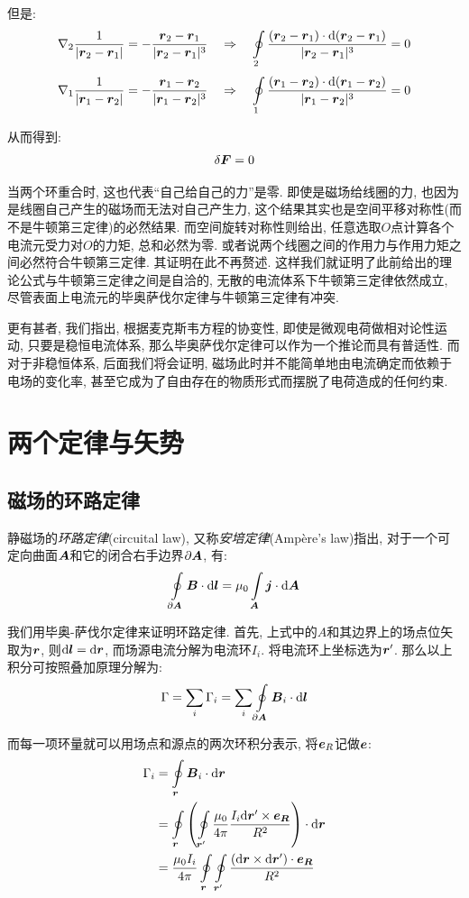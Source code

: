 但是:
\[\nabla_2 \frac{1}{|\boldsymbol{r}_2-\boldsymbol{r}_1|}=-\frac{\boldsymbol{r}_2-\boldsymbol{r}_1}{|\boldsymbol{r}_2-\boldsymbol{r}_1|^3}\quad\Rightarrow\quad \oint\limits_2\frac{(\boldsymbol{r}_2-\boldsymbol{r}_1)\cdot\textrm{d}(\boldsymbol{r}_2-\boldsymbol{r}_1)}{|\boldsymbol{r}_2-\boldsymbol{r}_1|^3}=0\]
\[\nabla_1 \frac{1}{|\boldsymbol{r}_1-\boldsymbol{r}_2|}=-\frac{\boldsymbol{r}_1-\boldsymbol{r}_2}{|\boldsymbol{r}_1-\boldsymbol{r}_2|^3}\quad\Rightarrow\quad \oint\limits_1\frac{(\boldsymbol{r}_1-\boldsymbol{r}_2)\cdot\textrm{d}(\boldsymbol{r}_1-\boldsymbol{r}_2)}{|\boldsymbol{r}_1-\boldsymbol{r}_2|^3}=0\]

从而得到:
\[\delta\boldsymbol{F}=0\]

当两个环重合时, 这也代表``自己给自己的力''是零. 即使是磁场给线圈的力, 也因为是线圈自己产生的磁场而无法对自己产生力, 这个结果其实也是空间平移对称性(而不是牛顿第三定律)的必然结果. 而空间旋转对称性则给出, 任意选取$O$点计算各个电流元受力对$O$的力矩, 总和必然为零. 或者说两个线圈之间的作用力与作用力矩之间必然符合牛顿第三定律. 其证明在此不再赘述. 这样我们就证明了此前给出的理论公式与牛顿第三定律之间是自洽的, 无散的电流体系下牛顿第三定律依然成立, 尽管表面上电流元的毕奥萨伐尔定律与牛顿第三定律有冲突.

更有甚者, 我们指出, 根据麦克斯韦方程的协变性, 即使是微观电荷做相对论性运动, 只要是稳恒电流体系, 那么毕奥萨伐尔定律可以作为一个推论而具有普适性. 而对于非稳恒体系, 后面我们将会证明, 磁场此时并不能简单地由电流确定而依赖于电场的变化率, 甚至它成为了自由存在的物质形式而摆脱了电荷造成的任何约束.

\section{两个定律与矢势}

\subsection{磁场的环路定律}

静磁场的\emph{环路定律}(circuital law), 又称\emph{安培定律}(Amp\`ere's law)指出, 对于一个可定向曲面$\boldsymbol{A}$和它的闭合右手边界$\partial\boldsymbol{A}$, 有:
\[\oint\limits_{\partial \boldsymbol{A}}\boldsymbol{B}\cdot \textrm{d} \boldsymbol{l}=\mu_0 \int\limits_{\boldsymbol{A}}\boldsymbol{j}\cdot \textrm{d} \boldsymbol{A}\]

我们用毕奥-萨伐尔定律来证明环路定律. 首先, 上式中的$A$和其边界上的场点位矢取为$\boldsymbol{r}$, 则$\textrm{d} \boldsymbol{l}=\textrm{d}\boldsymbol{r}$, 而场源电流分解为电流环$I_i$. 将电流环上坐标选为$\boldsymbol{r}'$. 那么以上积分可按照叠加原理分解为:
\[\Gamma=\sum_i \Gamma_i=\sum_i\oint\limits_{\partial \boldsymbol{A}}\boldsymbol{B}_i\cdot \textrm{d} \boldsymbol{l}\]

而每一项环量就可以用场点和源点的两次环积分表示, 将$\boldsymbol{e}_R$记做$\boldsymbol{e}$:
\begin{align*}
\Gamma_i 	&=\oint\limits_{\boldsymbol{r}}\boldsymbol{B}_i\cdot \textrm{d} \boldsymbol{r}\\
			&=\oint\limits_{\boldsymbol{r}}\left(\oint\limits_{\boldsymbol{r}'} \frac{\mu_0}{4\pi}\frac{I_i\textrm{d} \boldsymbol{r}'\times \boldsymbol{e}_{\boldsymbol{R}}}{R^2}\right)\cdot \textrm{d} \boldsymbol{r}\\
			&=\frac{\mu_0I_i}{4\pi} \oint\limits_{\boldsymbol{r}}\oint\limits_{\boldsymbol{r}'}\frac{(\textrm{d} \boldsymbol{r}\times \textrm{d} \boldsymbol{r}')\cdot \boldsymbol{e}_{\boldsymbol{R}}}{R^2}
\end{align*}

